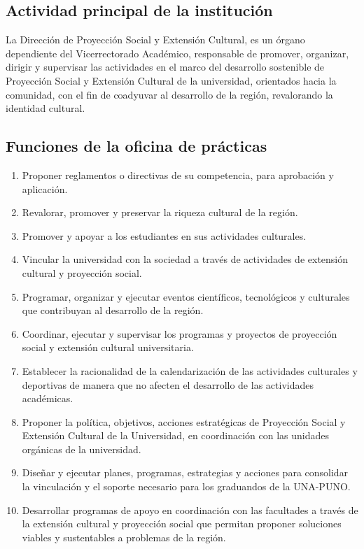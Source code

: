 \subsection{Actividad principal de la institución}
La Dirección de Proyección Social y Extensión Cultural, es un órgano dependiente del Vicerrectorado Académico, responsable de promover, organizar, dirigir y supervisar las actividades en el marco del desarrollo sostenible de Proyección Social y Extensión Cultural de la universidad, orientados hacia la comunidad, con el fin de coadyuvar al desarrollo de la región, revalorando la identidad cultural.


\subsection{Funciones de la oficina de prácticas}
\begin{enumerate}
    \item Proponer reglamentos o directivas de su competencia, para aprobación y aplicación.
    \item Revalorar, promover y preservar la riqueza cultural de la región.   
    \item Promover y apoyar a los estudiantes en sus actividades culturales.	
    \item Vincular la universidad con la sociedad a través de actividades de extensión cultural y proyección social.
    \item Programar, organizar y ejecutar eventos científicos, tecnológicos y culturales que contribuyan al desarrollo de la región.
    \item Coordinar, ejecutar y supervisar los programas y proyectos de proyección social y extensión cultural universitaria.
    \item Establecer la racionalidad de la calendarización de las actividades culturales y deportivas de manera que no afecten el desarrollo de las actividades académicas.
    \item Proponer la política, objetivos, acciones estratégicas de Proyección Social y Extensión Cultural de la Universidad, en coordinación con las unidades orgánicas de la universidad.
    \item Diseñar y ejecutar planes, programas, estrategias y acciones para consolidar la vinculación y el soporte necesario para los graduandos de la UNA-PUNO.
    \item Desarrollar programas de apoyo en coordinación con las facultades a través de la extensión cultural y proyección social que permitan proponer soluciones viables y sustentables a problemas de la región.

\end{enumerate}
